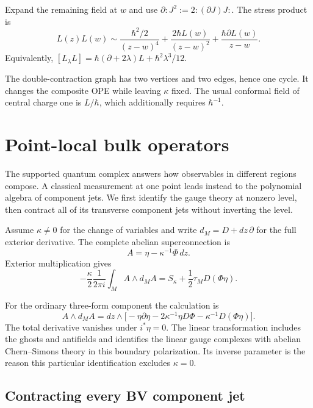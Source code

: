 Expand the remaining field at \(w\) and use
\(\partial:J^2:=2:(\partial J)J:\). The stress product is
\begin{equation}\label{pcsm:stress}
 L(z)L(w)\sim\frac{\hbar^2/2}{(z-w)^4}
       +\frac{2\hbar L(w)}{(z-w)^2}
       +\frac{\hbar\partial L(w)}{z-w}.
\end{equation}
Equivalently,
\([L_\lambda L]=\hbar(\partial+2\lambda)L+\hbar^2\lambda^3/12\).

The double-contraction graph has two vertices and two edges, hence
one cycle. It changes the composite OPE while leaving \(\kappa\)
fixed. The usual conformal field of central charge one is
\(L/\hbar\), which additionally requires \(\hbar^{-1}\).

\section{Point-local bulk operators}

The supported quantum complex answers how observables in different
regions compose. A classical measurement at one point leads instead
to the polynomial algebra of component jets.
We first identify the gauge theory at nonzero level, then contract
all of its transverse component jets without inverting the level.

Assume\label{pcsm:def:full-exterior-derivative} \(\kappa\ne0\) for the change of variables and write
\(d_M=D+dz\,\partial\) for the full exterior derivative.
The complete abelian superconnection is
\begin{equation}\label{pcsm:csmap}
 A=\eta-\kappa^{-1}\Phi\,dz.
\end{equation}
Exterior multiplication gives
\begin{equation}\label{pcsm:csaction}
 -\frac{\kappa}{2}\frac1{2\pi i}\int_M A\wedge d_MA
       =S_\kappa+\frac12\tau_M D(\Phi\eta).
\end{equation}

For\label{pcsm:eq:connection-three-form} the ordinary three-form component the calculation is
\[
 A\wedge d_MA
 =dz\wedge\bigl[-\eta\partial\eta
       -2\kappa^{-1}\eta D\Phi-\kappa^{-1}D(\Phi\eta)\bigr].
\]
The total derivative vanishes under \(i^*\eta=0\).
The linear transformation includes the ghosts and antifields and
identifies the linear gauge complexes with abelian Chern--Simons
theory in this boundary polarization. Its inverse parameter is the
reason this particular identification excludes \(\kappa=0\).

\subsection{Contracting every BV component jet}

